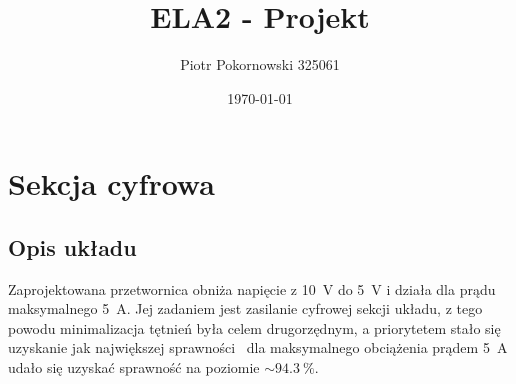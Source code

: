 \documentclass{article}
\title{ELA2 - Projekt}
\author{Piotr Pokornowski 325061}
\date{\today}
\begin{document}
\maketitle

\newpage

\section{Sekcja cyfrowa}
\subsection{Opis układu}
Zaprojektowana przetwornica obniża napięcie z \SI{10}{\V} do \SI{5}{\V} i działa dla prądu maksymalnego \SI{5}{\A}. Jej zadaniem jest zasilanie cyfrowej sekcji układu, z tego powodu minimalizacja tętnień była celem drugorzędnym, a priorytetem stało się uzyskanie jak największej sprawności \textemdash \ dla maksymalnego obciążenia prądem \SI{5}{\A} udało się uzyskać sprawność na poziomie $\sim \SI{94.3}{\percent}$.

\begin{figure}[H]
    \centering
    \begin{adjustbox}{width=1.1\textwidth,center}
        \qquad
    \end{adjustbox}
\end{figure}
\end{document}
